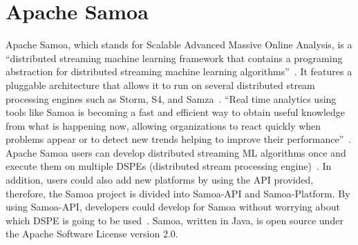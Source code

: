 \section{Apache Samoa}
Apache Samoa, which stands for Scalable Advanced Massive Online Analysis, is a ``distributed 
streaming machine learning framework that contains a programing abstraction for distributed 
streaming machine learning algorithms''~\cite{hid-sp18-405-www-samoa}. It features a pluggable 
architecture that allows it to run on several distributed stream processing engines such as Storm, S4, 
and Samza~\cite{hid-sp18-405-www-samoa}. ``Real time analytics using tools like Samoa is becoming 
a fast and efficient way to obtain useful knowledge from what is happening now, allowing 
organizations to react quickly when problems appear or to detect new trends helping to improve their 
performance''~\cite{hid-sp18-405-bif2015mining-samoa}. Apache Samoa users can develop distributed 
streaming ML algorithms once and execute them on multiple DSPEs (distributed stream processing 
engine)~\cite{hid-sp18-405-mor2015samoa-samoa}. In addition, users could also add new platforms 
by using the API provided, therefore, the Samoa project is divided into Samoa-API and 
Samoa-Platform. By using Samoa-API, developers could develop for Samoa without worrying about 
which DSPE is going to be used~\cite{hid-sp18-405-blog-samoa}. Samoa, written in Java, is open 
source under the Apache Software License version 2.0.

